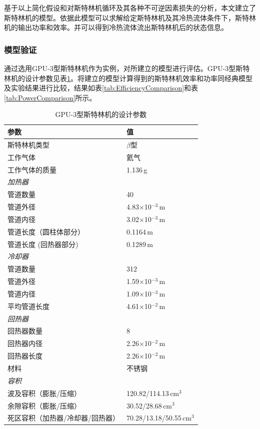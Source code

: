 基于以上简化假设和对斯特林机循环及其各种不可逆因素损失的分析，本文建立了斯特林机的模型。依据此模型可以求解给定斯特林机及其冷热流体条件下，斯特林机的输出功率和效率。并可以得到冷热流体流出斯特林机后的状态信息。

\subsubsection{模型验证}
\label{sec:modelValidation}

通过选用GPU-3型斯特林机作为实例，对所建立的模型进行评估。GPU-3型斯特林机的设计参数见表\ref{tab:GPU3parameters}\cite{Babaelahi2015,Martini1983}。将建立的模型计算得到的斯特林机效率和功率同经典模型及实验结果进行比较，结果如表\ref{tab:EfficiencyComparison}和表\ref{tab:PowerComparison}所示。

\begin{table}[htbp]\footnotesize
\setlength{\abovecaptionskip}{-10pt}
	\caption{GPU-3型斯特林机的设计参数}
	\begin{center}
	\begin{tabular}{ll}
		\toprule
		参数				&	值\\
		\midrule
		斯特林机类型					&	$\beta$型\\
		工作气体			&	氦气\\
		工作气体的质量	&	1.136\,g\\
		\emph{加热器}			&\\
		管道数量		&	40\\
		管道外径	&	4.83$\times$10$^{-3}\,\mathrm{m}$\\
		管道内径	&	3.02$\times$10$^{-3}\,\mathrm{m}$\\
		管道长度（圆柱体部分）		&	0.1164\,m\\
		管道长度 (回热器部分)		&	0.1289\,m\\
		\emph{冷却器}			&\\
		管道数量		&	312\\
		管道外径	&	1.59$\times$10$^{-3}\,\mathrm{m}$\\
		管道内径	&	1.09$\times$10$^{-3}\,\mathrm{m}$\\
		平均管道长度		&	4.61$\times$10$^{-2}\,\mathrm{m}$\\
		\emph{回热器}		&\\
		回热器数量	&	8\\
		回热器内径	&	2.26$\times$10$^{-2}\,\mathrm{m}$\\
		回热器长度		&	2.26$\times$10$^{-2}\,\mathrm{m}$\\
		材料				&	不锈钢\\
		\emph{容积}			&\\
		波及容积（膨胀/压缩）	&	120.82/114.13$\,\mathrm{cm}^3$\\
		余隙容积（膨胀/压缩）	&	30.52/28.68$\,\mathrm{cm}^3$\\
		死区容积（加热器/冷却器/回热器）	&	70.28/13.18/50.55$\,\mathrm{cm}^3$\\
		\bottomrule
	\end{tabular}
	\end{center}
	\label{tab:GPU3parameters}
\end{table}

